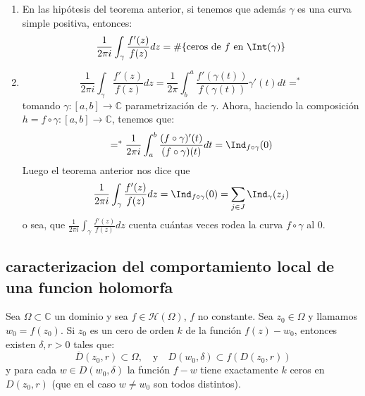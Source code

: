 \begin{observación}
    \vspace{-2em}
    \begin{enumerate}
        \item En las hipótesis del teorema anterior, si tenemos que además $\gamma$ es una curva simple positiva, entonces:
        \[
            \frac{1}{2 \pi i} \int_\gamma \frac{f'(z)}{f(z)} dz =
            \# \{ \text{ceros de } f \text{ en } \Int(\gamma) \}
        \]
        \item 
        \[
            \frac{1}{2 \pi i} \int_\gamma \frac{f'(z)}{f(z)} dz = \frac{1}{2 \pi} \int_b^a \frac{f'(\gamma(t))}{f(\gamma(t))} \gamma'(t) dt =^*
        \]
        tomando $\gamma : [a,b] \to \mathbb{C}$ parametrización de $\gamma$. Ahora, haciendo la composición $h = f \circ \gamma : [a,b] \to \mathbb{C}$, tenemos que:
        \[
            =^* \frac{1}{2 \pi i} \int_a^b \frac{(f \circ \gamma)'(t)}{(f \circ \gamma)(t)} dt = \Ind_{f \circ \gamma}(0)
        \]
        Luego el teorema anterior nos dice que 
        \[
            \frac{1}{2 \pi i} \int_\gamma \frac{f'(z)}{f(z)} dz = \Ind_{f \circ \gamma}(0) = \sum_{j \in J} \Ind_\gamma (z_j)
        \]
        o sea, que $\frac{1}{2 \pi i} \int_\gamma \frac{f'(z)}{f(z)} dz$ cuenta cuántas veces rodea la curva $f \circ \gamma$ al $0$.
    \end{enumerate} \label{obs:comportamiento_local}
\end{observación}

\subsection{caracterizacion del comportamiento local de una funcion holomorfa}

\begin{teorema} 
    Sea $\Omega \subset \mathbb{C}$ un dominio y sea $f \in \mathcal{H}(\Omega)$, $f$ no constante. Sea $z_0 \in \Omega$ y llamamos $w_0 = f(z_0)$. Si $z_0$ es un cero de orden $k$ de la función $f(z) - w_0$, entonces existen $\delta, r >0$ tales que:
    \[
        \overline{D}(z_0,r) \subset \Omega, \quad \text{y} \quad D(w_0, \delta) \subset f(D(z_0,r))
    \]
    y para cada $w \in D(w_0,\delta)$ la función $f-w$ tiene exactamente $k$ ceros en $D(z_0,r)$ (que en el caso $w \neq w_0$ son todos distintos).
\end{teorema}


